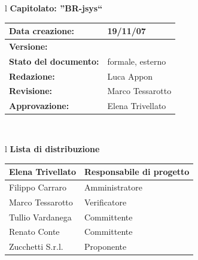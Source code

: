 \documentclass[11pt,titlepage,a4paper]{report}
\begin{document}
\begin{center}
\thispagestyle{plain}
\begin{table}[htbp]
\large{
\begin{tabular}{l}
\Large{\textbf{\textsf{Capitolato: ''BR-jsys``}}} \\
\begin{tabular}{||p{6cm}||p{6cm}||} \hline
\textbf{Data creazione:} & 19/11/07 \\ \hline
\textbf{Versione:} & \lv \\ \hline
\textbf{Stato del documento:} & formale, esterno \\ \hline
\textbf{Redazione:} & Luca Appon \\ \hline
\textbf{Revisione:} & Marco Tessarotto   \\ \hline
\textbf{Approvazione:}  & Elena Trivellato\\ \hline
\end{tabular} \\
\end{tabular}
}
\end{table}

\begin{table}[hbtp]
\large{
\begin{tabular}{l}
\Large{\textbf{\textsf{Lista di distribuzione}}} \\
\begin{tabular}{||p{6cm}||p{6cm}||} \hline
{Elena Trivellato}& Responsabile di progetto \\ \hline 
{Filippo Carraro}& Amministratore \\ \hline
{Marco Tessarotto}& Verificatore \\ \hline
{Tullio Vardanega}& Committente \\ \hline
{Renato Conte}& Committente \\ \hline
{Zucchetti S.r.l.}& Proponente \\ \hline
\end{tabular} \\
\end{tabular}
}
\end{table}


\end{center}
\end{document}
